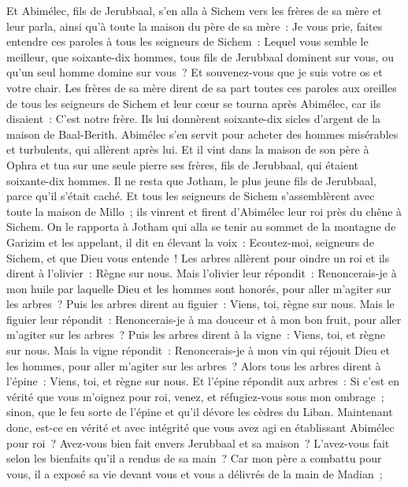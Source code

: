 \begin{multicols}{2}
\VerseOne{}Et Abimélec, fils de Jerubbaal, s'en alla à Sichem vers les frères de sa mère et leur parla, ainsi qu'à toute la maison du père de sa mère~:
Je vous prie, faites entendre ces paroles à tous les seigneurs de Sichem~: Lequel vous semble le meilleur, que soixante-dix hommes, tous fils de Jerubbaal dominent sur vous, ou qu'un seul homme domine sur vous~? Et souvenez-vous que je suis votre os et votre chair.
Les frères de sa mère dirent de sa part toutes ces paroles aux oreilles de tous les seigneurs de Sichem et leur cœur se tourna après Abimélec, car ils disaient~: C'est notre frère.
Ils lui donnèrent soixante-dix sicles d'argent de la maison de Baal-Berith. Abimélec s'en servit pour acheter des hommes misérables et turbulents, qui allèrent après lui.
Et il vint dans la maison de son père à Ophra et tua sur une seule pierre ses frères, fils de Jerubbaal, qui étaient soixante-dix hommes. Il ne resta que Jotham, le plus jeune fils de Jerubbaal, parce qu'il s'était caché.
Et tous les seigneurs de Sichem s'assemblèrent avec toute la maison de Millo~; ils vinrent et firent d'Abimélec leur roi près du chêne à Sichem.
On le rapporta à Jotham qui alla se tenir au sommet de la montagne de Garizim et les appelant, il dit en élevant la voix~: Ecoutez-moi, seigneurs de Sichem, et que Dieu vous entende~!
Les arbres allèrent pour oindre un roi et ils dirent à l'olivier~: Règne sur nous.
Mais l'olivier leur répondit~: Renoncerais-je à mon huile par laquelle Dieu et les hommes sont honorés, pour aller m'agiter sur les arbres~?
Puis les arbres dirent au figuier~: Viens, toi, règne sur nous.
Mais le figuier leur répondit~: Renoncerais-je à ma douceur et à mon bon fruit, pour aller m'agiter sur les arbres~?
Puis les arbres dirent à la vigne~: Viens, toi, et règne sur nous.
Mais la vigne répondit~: Renoncerais-je à mon vin qui réjouit Dieu et les hommes, pour aller m'agiter sur les arbres~?
Alors tous les arbres dirent à l'épine~: Viens, toi, et règne sur nous.
Et l'épine répondit aux arbres~: Si c'est en vérité que vous m'oignez pour roi, venez, et réfugiez-vous sous mon ombrage~; sinon, que le feu sorte de l'épine et qu'il dévore les cèdres du Liban.
Maintenant donc, est-ce en vérité et avec intégrité que vous avez agi en établissant Abimélec pour roi~? Avez-vous bien fait envers Jerubbaal et sa maison~? L'avez-vous fait selon les bienfaits qu'il a rendus de sa main~?
Car mon père a combattu pour vous, il a exposé sa vie devant vous et vous a délivrés de la main de Madian~;

\end{multicols}
